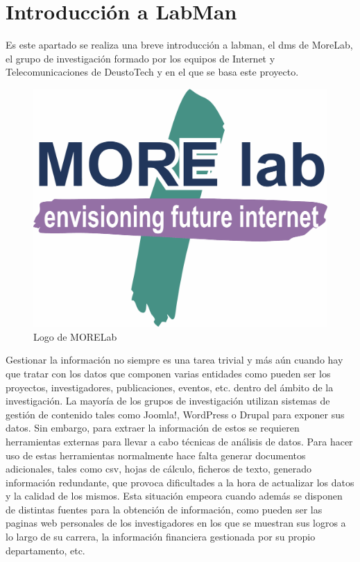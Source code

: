 \section{Introducción a LabMan}

Es este apartado se realiza una breve introducción a \acrfull{labman}, el \acrlong{dms} de MoreLab, el grupo de investigación formado por los equipos de Internet y Telecomunicaciones de DeustoTech y en el que se basa este proyecto.

\begin{figure}[!htp]
	\centering
	\includegraphics[scale=0.15]{fig/morelab-logo}
	\caption{Logo de MORELab}
\end{figure}

Gestionar la información no siempre es una tarea trivial y más aún cuando hay que tratar con los datos que componen varias entidades como pueden ser los proyectos, investigadores, publicaciones, eventos, etc. dentro del ámbito de la investigación. La mayoría de los grupos de investigación utilizan sistemas de gestión de contenido tales como Joomla!\cite{joomla}, WordPress\cite{wordpress} o Drupal\cite{drupal} para exponer sus datos. Sin embargo, para extraer la información de estos  se requieren herramientas externas para llevar a cabo técnicas de análisis de datos. 
Para hacer uso de estas herramientas normalmente hace falta generar documentos adicionales, tales como \acrshort{csv}, hojas de cálculo, ficheros de texto, generado información redundante, que provoca dificultades a la hora de actualizar los datos y la calidad de los mismos. Esta situación empeora cuando además se disponen de distintas fuentes para la obtención de información, como pueden ser las paginas web personales de los investigadores en los que se muestran sus logros a lo largo de su carrera, la información financiera gestionada por su propio departamento, etc.

